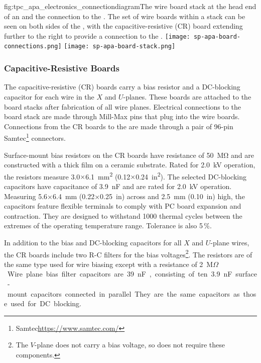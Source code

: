 \begin{dunefigure}{fig:tpc_apa_electronics_connectiondiagram}{The wire board stack at the head end of an  and the connection to the . The set of wire boards within a stack can be seen on both sides of the , with the capacitive-resistive (CR) board extending further to the right to provide a connection to the .}
\texttt{[image: sp-apa-board-connections.png]}
\texttt{[image: sp-apa-board-stack.png]}
\end{dunefigure} 


\subsubsection{Capacitive-Resistive Boards}
\label{sec:crboards}

The capacitive-resistive (CR) boards carry a bias resistor and a DC-blocking capacitor for each wire in the $X$ and $U$-planes. These boards are attached to the board stacks after fabrication of all wire planes.   Electrical connections to the board stack are made through Mill-Max pins that plug into the wire boards. Connections from the CR boards to the  are made through a pair of \num{96}-pin Samtec\footnote{Samtec\texttrademark \url{https://www.samtec.com/}} connectors.

Surface-mount bias resistors on the CR boards have resistance of \SI{50}{\mega\ohm} and are constructed with a thick film on a ceramic substrate. Rated for \SI{2.0}{kV} operation, the resistors measure \num{3.0}$\times$\SI{6.1}{mm^2} (\num{0.12}$\times$\SI{0.24}{in^2}). The selected DC-blocking capacitors have capacitance of \SI{3.9}{nF} and are rated for \SI{2.0}{kV} operation. Measuring \num{5.6}$\times$\SI{6.4}{mm} (\num{0.22}$\times$\SI{0.25}{in}) across and \SI{2.5}{mm} (\SI{0.10}{in}) high, the capacitors feature flexible terminals to comply with PC board expansion and contraction. They are designed to withstand \num{1000} thermal cycles between the extremes of the operating temperature range. Tolerance is also \num{5}\,\%.

In addition to the bias and DC-blocking capacitors for all $X$ and $U$-plane wires, the CR boards include two R-C filters for the bias voltages\footnote{The $V$-plane does not carry a bias voltage, so does not require these components.}. The resistors are of the same type used for wire biasing except with a resistance of \SI{2}{M$\Omega$}. Wire plane bias filter capacitors are \SI{39}{nF}, consisting of ten \SI{3.9}{nF} surface-mount capacitors connected in parallel. They are the same capacitors as those used for DC blocking.

